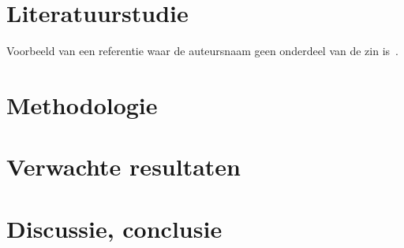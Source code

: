 \documentclass{hogent-article}
\begin{document}
\section{Literatuurstudie}%
\label{sec:literatuurstudie}


Voorbeeld van een referentie waar de auteursnaam geen onderdeel van de zin is~\autocite{Moore2002}.

\lipsum[4-9]

\section{Methodologie}%
\label{sec:methodologie}


\lipsum[10-12]

\section{Verwachte resultaten}%
\label{sec:verwachte-resultaten}


\lipsum[14-18]

\section{Discussie, conclusie}%
\label{sec:discussie-conclusie}

\lipsum[19-21]


\printbibliography[heading=bibintoc]
\end{document}
